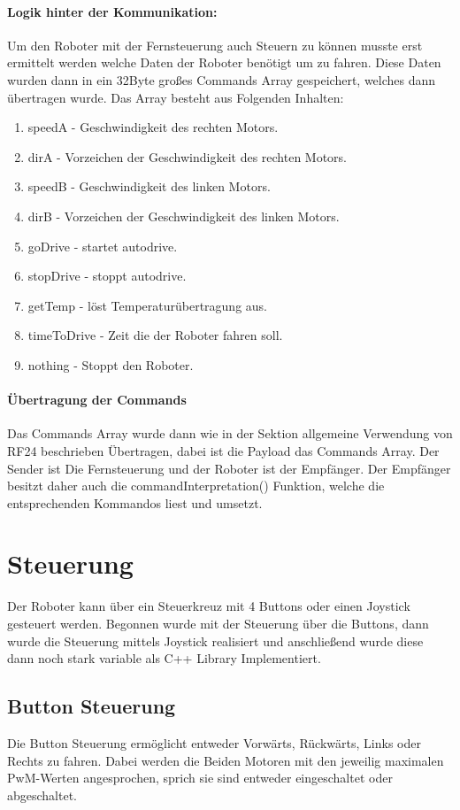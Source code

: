 \documentclass[12pt]{article}
\begin{document}
	\paragraph{Logik hinter der Kommunikation: }
	Um den Roboter mit der Fernsteuerung auch Steuern zu können musste erst ermittelt werden welche Daten der Roboter benötigt um zu fahren. Diese Daten wurden dann in ein 32Byte großes Commands Array gespeichert, welches dann übertragen wurde. Das Array besteht aus Folgenden Inhalten:
\begin{enumerate}
\item speedA      - Geschwindigkeit des rechten Motors. 
\item dirA        - Vorzeichen der Geschwindigkeit des rechten Motors.
\item speedB      - Geschwindigkeit des linken Motors.
\item dirB        - Vorzeichen der Geschwindigkeit des linken Motors.
\item goDrive     - startet autodrive.
\item stopDrive   - stoppt autodrive.
\item getTemp     - löst Temperaturübertragung aus.
\item timeToDrive - Zeit die der Roboter fahren soll.
\item nothing     - Stoppt den Roboter.
\end{enumerate}

\paragraph{Übertragung der Commands} 
Das Commands Array wurde dann wie in der Sektion allgemeine Verwendung von RF24 beschrieben Übertragen, dabei ist die Payload das Commands Array. Der Sender ist Die Fernsteuerung und der Roboter ist der Empfänger. Der Empfänger besitzt daher auch die commandInterpretation() Funktion, welche die entsprechenden Kommandos liest und umsetzt.

\newpage
\section{Steuerung} %
Der Roboter kann über ein Steuerkreuz mit 4 Buttons oder einen Joystick gesteuert werden. Begonnen wurde mit der Steuerung über die Buttons, dann wurde die Steuerung mittels Joystick realisiert und anschließend wurde diese dann noch stark variable als C++ Library Implementiert.

\subsection{Button Steuerung} %
Die Button Steuerung ermöglicht entweder Vorwärts, Rückwärts, Links oder Rechts zu fahren. Dabei werden die Beiden Motoren mit den jeweilig maximalen PwM-Werten angesprochen, sprich sie sind entweder eingeschaltet oder abgeschaltet.
\end{document}
